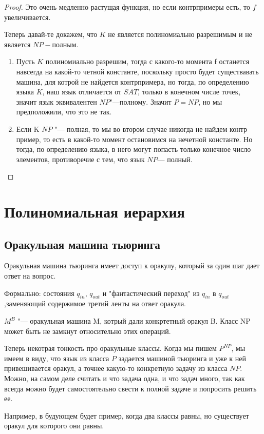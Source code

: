 \begin{proof}
	Это очень медленно растущая функция, но если контрпримеры есть, то $f$ увеличивается.

	Теперь давай-те докажем, что $K$  не является полиномиально разрешимым и не является $NP-$полным. 
	\begin{enumerate}
		\item Пусть $K$ полиномиально разрешим, тогда с какого-то момента f останется навсегда на какой-то 
		четной константе, поскольку просто будет существавать машина, для котрой не найдется контрпримера, но тогда, 
		по определению языка $K$, наш язык отличается от $SAT$, только в конечном числе точек, значит 
		язык эквивалентен $NP$"---полному. Значит $P = NP$, но мы предположили, что это не так. 	
		\item Если K $NP$ "--- полная, то мы во втором случае никогда не найдем контр пример, то 
		есть в какой-то момент остановимся на нечетной константе. 
		Но тогда, по определению языка, в него могут попасть только конечное число элементов, противоречие с тем, что язык $NP$--- полный. 
\end{enumerate}
\end{proof}

\section{Полиномиальная иерархия}
\subsection{Оракульная машина тьюринга}
	\begin{Def}
	Оракульная машина тьюринга имеет доступ к оракулу, который за один шаг
	дает ответ на вопрос. 

	Формально: состояния $q_{in}$, $q_{out}$  и "фантастический переход" из 
	$q_{in}$ в $q_{out}$,заменяющий содержимое третий ленты на ответ оракула. 
	\end{Def}
	$M^B$ "--- оракульная машина M, котрый дали конкртетный оракул B. Класс NP может быть не замкнут относительно этих операций. 


Теперь некотрая тонкость про оракульные классы. Когда мы пишем $P^{NP}$, мы имеем в виду, что язык из класса 
$P$ задается машиной тьюринга и уже к ней привешивается оракул, а точнее какую-то конкретную задачу из класса $NP$.
Можно, на самом деле считать и что задача одна, и что задач много, так как всегда можно будет самостоятельно свести
к полной задаче и попросить решить ее. 

Например, в будующем будет пример, когда два классы равны, но существует оракул для которого они равны. 

